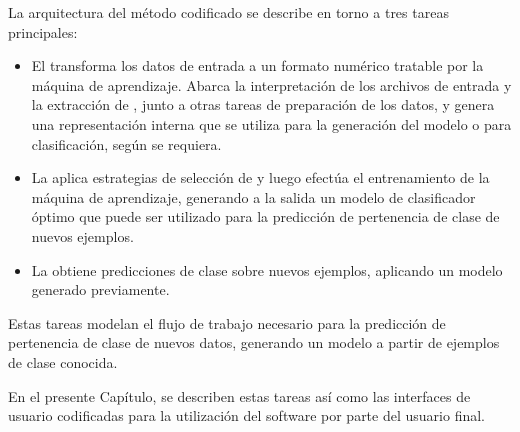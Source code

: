 %
%
%
%

La arquitectura del método codificado se describe en torno a tres
tareas principales:
%
\begin{itemize}
\item
  El  transforma los datos de entrada a un formato
  numérico tratable por la máquina de aprendizaje.
  Abarca la interpretación de los archivos de entrada y la extracción
  de , junto a otras tareas de preparación de los datos, y
  genera una representación interna que se utiliza para la generación
  del modelo o para clasificación, según se requiera.
\item
  La  aplica estrategias de
  selección de  y luego efectúa el entrenamiento de la
  máquina de aprendizaje, generando a la salida un modelo de
  clasificador óptimo que puede ser utilizado para la predicción de
  pertenencia de clase de nuevos ejemplos.
\item
  La  obtiene predicciones de clase sobre nuevos
  ejemplos, aplicando un modelo generado previamente.
\end{itemize}
%
Estas tareas modelan el flujo de trabajo necesario para la predicción
de pertenencia de clase de nuevos datos, generando un modelo a partir
de ejemplos de clase conocida.

En el presente Capítulo, se describen estas tareas así como las
interfaces de usuario codificadas para la utilización del software por
parte del usuario final.
